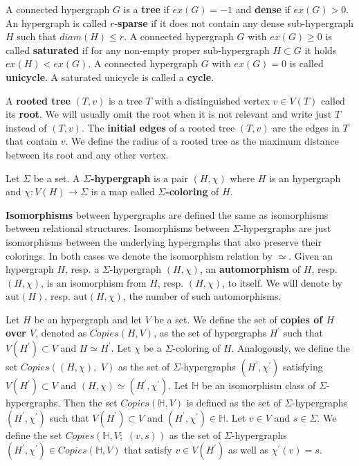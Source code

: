 \documentclass[12pt,notitlepage,a4paper]{article}
\theoremstyle{definition}
\newcommand{\aut}{\mathrm{aut}}
\begin{document}
\par
A connected hypergraph $G$ is a \textbf{tree} if $ex(G)=-1$ and \textbf{dense} if $ex(G)>0$.
An hypergraph is called $r$-\textbf{sparse} if it does not contain any dense sub-hypergraph $H$
such that $diam(H)\leq r$.
A connected hypergraph $G$ with $ex(G)\geq 0$ is called \textbf{saturated} 
if for any non-empty proper sub-hypergraph
$H\subset G$ it holds $ex(H)<ex(G)$. 
A connected hypergraph $G$ with $ex(G)=0$ is called \textbf{unicycle}. 
A saturated unicycle is called a \textbf{cycle}. \par
A \textbf{rooted tree} $(T,v)$ is a tree $T$ with a 
distinguished vertex $v\in V(T)$ called its \textbf{root}.
We will usually omit the root when it is not relevant and 
write just $T$ instead of $(T,v)$. The
\textbf{initial edges} of a rooted tree $(T,v)$ are 
the edges in $T$ that contain $v$. 
We define the radius of a rooted tree
as the maximum distance between its root
and any other vertex.
\par


Let $\Sigma$ be a set. A \textbf{$\Sigma$-hypergraph}
is a pair $(H, \chi)$ where $H$ is an hypergraph
and $\chi: V(H)\rightarrow \Sigma$ is a map 
called \textbf{$\Sigma$-coloring} of $H$. \par


\textbf{Isomorphisms} between hypergraphs are defined the same as 
isomorphisms between relational structures. Isomorphisms between $\Sigma$-hypergraphs are just
isomorphisms between the underlying hypergraphs that also preserve their colorings. 
In both cases we denote the isomorphism relation by $\simeq$. 
Given an hypergraph $H$, resp. a $\Sigma$-hypergraph $(H, \chi)$,
an \textbf{automorphism} of $H$, resp. $(H,\chi)$,
is an isomorphism from $H$, resp. $(H,\chi)$, to itself.
We will denote by $\aut(H)$, resp. $\aut(H,\chi)$,
 the number of such automorphisms. \par

Let $H$ be an hypergraph and let $V$ be a set. We define the
set of \textbf{copies of $H$ over $V$}, denoted as $Copies(H,V)$, 
as the set of hypergraphs 
$H^\prime$ such that
$V(H^\prime)\subset V$ and $H\simeq H^\prime$. Let 
$\chi$ be a $\Sigma$-coloring of $H$. 
Analogously, we define the set $Copies\left(
(H,\chi),\, \, V\right)$ as the set of $\Sigma$-hypergraphs
$(H^\prime,\chi^\prime)$ satisfying $V(H^\prime)\subset V$ and
$(H,\chi)\simeq (H^\prime,\chi^\prime)$. Let $\mathbb{H}$ be 
an isomorphism class of $\Sigma$-hypergraphs. Then the set
$Copies(\mathbb{H}, V)$ is defined as the set of $\Sigma$-hypergraphs
$(H^\prime,\chi^\prime)$ such that 
$V(H^\prime)\subset V$ and
$(H^\prime,\chi^\prime)\in \mathbb{H}$. 
Let $v\in V$ and $s\in \Sigma$. We define the
set $Copies\left(\mathbb{H}, V;\,\, (v,s)\right)$ 
as the set of $\Sigma$-hypergraphs
$(H^\prime,\chi^\prime)\in Copies(\mathbb{H}, V)$
that satisfy $v\in V(H^\prime)$ as well as
$\chi^\prime(v)=s$. \par
\end{document}
